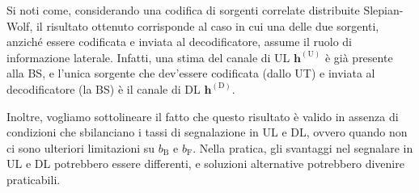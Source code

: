 Si noti come, considerando una codifica di sorgenti correlate distribuite
Slepian-Wolf, il risultato ottenuto corrisponde al caso in cui una delle due
sorgenti, anziché essere codificata e inviata al decodificatore, assume il
ruolo di informazione laterale. Infatti, una stima del canale di UL
\(\bm{h}^\mathrm{(U)}\) è già presente alla BS, e l'unica sorgente che
dev'essere codificata (dallo UT) e inviata al decodificatore (la BS) è il
canale di DL \(\bm{h}^\mathrm{(D)}\).

Inoltre, vogliamo sottolineare il fatto che questo risultato è valido in
assenza di condizioni che sbilanciano i tassi di segnalazione in UL e DL,
ovvero quando non ci sono ulteriori limitazioni su \(b_\mathrm{B}\) e
\(b_\mathrm{F}\). Nella pratica, gli svantaggi nel segnalare in UL e DL
potrebbero essere differenti, e soluzioni alternative potrebbero divenire
praticabili.
